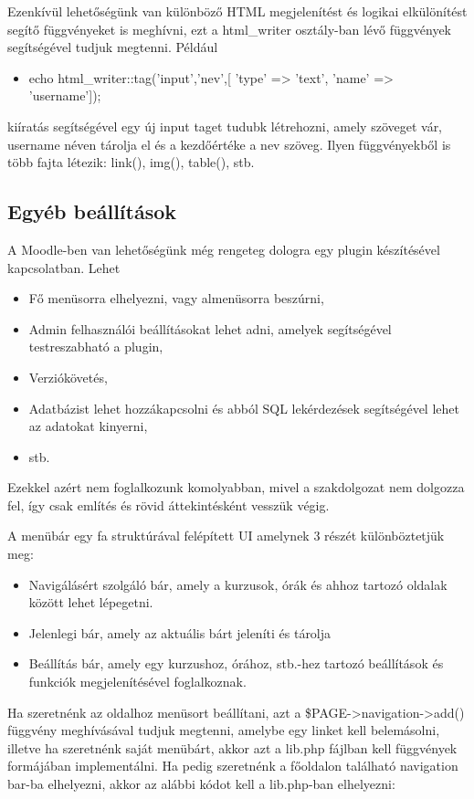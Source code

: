 Ezenkívül lehetőségünk van különböző HTML megjelenítést és logikai elkülönítést segítő függvényeket is meghívni, ezt a html\_writer osztály-ban lévő függvények segítségével tudjuk megtenni. Például
\begin{itemize}
    \item[] echo html\_writer::tag('input','nev',[ 'type' => 'text', 'name' => 'username']); 
\end{itemize}
kiíratás segítségével egy új input taget tudubk létrehozni, amely szöveget vár, username néven tárolja el és a kezdőértéke a nev szöveg. Ilyen függvényekből is több fajta létezik: link(), img(), table(), stb.

\subsection{Egyéb beállítások}

A Moodle-ben van lehetőségünk még rengeteg dologra egy plugin készítésével kapcsolatban. Lehet
\begin{itemize}
    \item Fő menüsorra elhelyezni, vagy almenüsorra beszúrni,
    \item Admin felhasználói beállításokat lehet adni, amelyek segítségével testreszabható a plugin,
    \item Verziókövetés, 
    \item Adatbázist lehet hozzákapcsolni és abból SQL lekérdezések segítségével lehet az adatokat kinyerni,
    \item stb.
\end{itemize}

Ezekkel azért nem foglalkozunk komolyabban, mivel a szakdolgozat nem dolgozza fel, így csak említés és rövid áttekintésként vesszük végig. \par

A menübár egy fa struktúrával felépített UI amelynek 3 részét különböztetjük meg:
\begin{itemize}
    \item Navigálásért szolgáló bár, amely a kurzusok, órák és ahhoz tartozó oldalak között lehet lépegetni.
    \item Jelenlegi bár, amely az aktuális bárt jeleníti és tárolja
    \item Beállítás bár, amely egy kurzushoz, órához, stb.-hez tartozó beállítások és funkciók megjelenítésével foglalkoznak.
\end{itemize}

Ha szeretnénk az oldalhoz menüsort beállítani, azt a \$PAGE->navigation->add() függvény meghívásával tudjuk megtenni, amelybe egy linket kell belemásolni, illetve ha szeretnénk saját menübárt, akkor azt a lib.php fájlban kell függvények formájában implementálni. Ha pedig szeretnénk a főoldalon található navigation bar-ba elhelyezni, akkor az alábbi kódot kell a lib.php-ban elhelyezni: 

